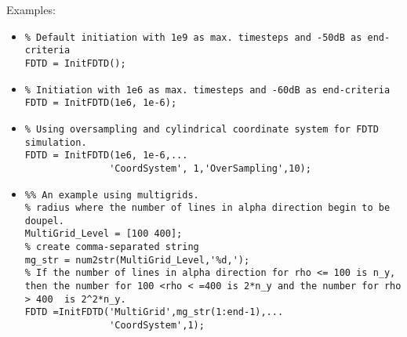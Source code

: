 	\begin{FontDescr}{Examples:}
\begin{itemize}
\item 
\begin{lstlisting}
% Default initiation with 1e9 as max. timesteps and -50dB as end-criteria
FDTD = InitFDTD(); 
\end{lstlisting}

\item 
\begin{lstlisting}
% Initiation with 1e6 as max. timesteps and -60dB as end-criteria
FDTD = InitFDTD(1e6, 1e-6);
\end{lstlisting}

\item 
\begin{lstlisting}
% Using oversampling and cylindrical coordinate system for FDTD simulation.
FDTD = InitFDTD(1e6, 1e-6,...
               'CoordSystem', 1,'OverSampling',10);
\end{lstlisting}

\item 
\begin{lstlisting}
%% An example using multigrids.
% radius where the number of lines in alpha direction begin to be doupel.
MultiGrid_Level = [100 400];
% create comma-separated string
mg_str = num2str(MultiGrid_Level,'%d,');
% If the number of lines in alpha direction for rho <= 100 is n_y, then the number for 100 <rho < =400 is 2*n_y and the number for rho > 400  is 2^2*n_y.
FDTD =InitFDTD('MultiGrid',mg_str(1:end-1),...
               'CoordSystem',1);
\end{lstlisting}
\end{itemize}	 
	\end{FontDescr}



	      \\
